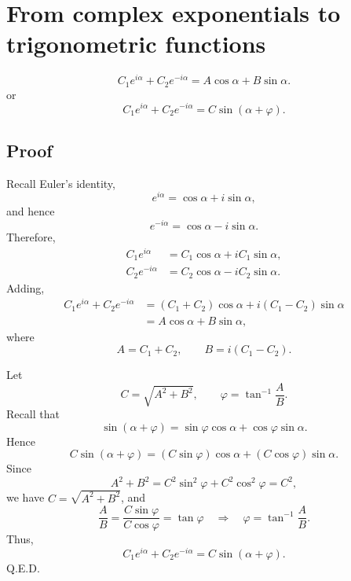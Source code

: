 \section*{From complex exponentials to trigonometric functions}

\begin{equation}
    C_1e^{i\alpha}+C_2e^{-i\alpha}=A\cos\alpha+B\sin\alpha.
    \tag{12a}
\end{equation}
or
\begin{equation}
    C_1e^{i\alpha}+C_2e^{-i\alpha}=C\sin(\alpha+\varphi).
    \tag{12b}
\end{equation}

\subsection*{Proof}

Recall Euler's identity,
\begin{equation*}
    e^{i\alpha}=\cos\alpha+i\sin\alpha,
\end{equation*}
and hence
\begin{equation*}
    e^{-i\alpha}=\cos\alpha-i\sin\alpha.
\end{equation*}
Therefore,
\begin{align*}
    C_1e^{i\alpha}&=C_1\cos\alpha+iC_1\sin\alpha,\\
    C_2e^{-i\alpha}&=C_2\cos\alpha-iC_2\sin\alpha.
\end{align*}
Adding,
\begin{align*}
    C_1e^{i\alpha}+C_2e^{-i\alpha}
      &=(C_1+C_2)\cos\alpha+i(C_1-C_2)\sin\alpha\\
      &=A\cos\alpha+B\sin\alpha,
\end{align*}
where
\begin{equation*}
    A=C_1+C_2,\qquad B=i(C_1-C_2).
\end{equation*}

Let
\begin{equation*}
    C=\sqrt{A^2+B^2},\qquad \varphi=\tan^{-1}\frac{A}{B}.
\end{equation*}
Recall that
\begin{equation*}
    \sin(\alpha+\varphi)=\sin\varphi\cos\alpha+\cos\varphi\sin\alpha.
\end{equation*}
Hence
\begin{equation*}
    C\sin(\alpha+\varphi)=(C\sin\varphi)\cos\alpha+(C\cos\varphi)\sin\alpha.
\end{equation*}
Since
\begin{equation*}
    A^2+B^2=C^2\sin^2\varphi+C^2\cos^2\varphi=C^2,
\end{equation*}
we have $C=\sqrt{A^2+B^2}$, and
\begin{equation*}
    \frac{A}{B}=\frac{C\sin\varphi}{C\cos\varphi}=\tan\varphi
    \quad\Longrightarrow\quad
    \varphi=\tan^{-1}\frac{A}{B}.
\end{equation*}
Thus,
\begin{equation}
    C_1e^{i\alpha}+C_2e^{-i\alpha}=C\sin(\alpha+\varphi).
    \tag{12c}
\end{equation}
\hfill Q.E.D.
